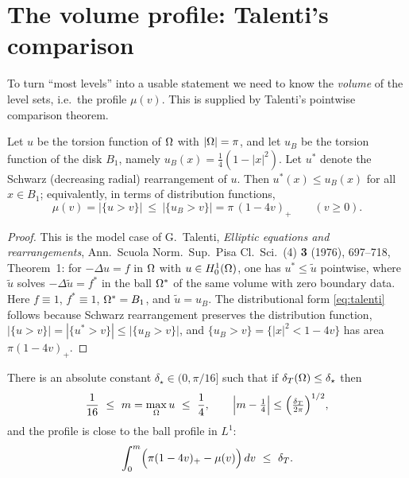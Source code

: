 \section{The volume profile: Talenti's comparison}\label{sec:talenti}

To turn ``most levels'' into a usable statement we need to know the
\emph{volume} of the level sets, i.e.\ the profile $\mu(v)$. This is
supplied by Talenti's pointwise comparison theorem.

\begin{theorem}[Talenti]\label{thm:talenti}
Let $u$ be the torsion function of $\Omega$ with $|\Omega|=\pi$, and let $u_B$ be
the torsion function of the disk $B_1$, namely
$u_B(x)=\tfrac14(1-|x|^2)$. Let $u^\ast$ denote the Schwarz (decreasing
radial) rearrangement of $u$. Then $u^\ast(x)\le u_B(x)$ for all $x\in
B_1$; equivalently, in terms of distribution functions,
\begin{equation}\label{eq:talenti}
   \mu(v)=|\{u>v\}|\ \le\ |\{u_B>v\}|=\pi\,(1-4v)_+\qquad(v\ge0).
\end{equation}
\end{theorem}

\begin{proof}
This is the model case of G.~Talenti, \emph{Elliptic equations and
rearrangements}, Ann.\ Scuola Norm.\ Sup.\ Pisa Cl.\ Sci.\ (4)
\textbf{3} (1976), 697--718, Theorem~1: for $-\Delta u=f$ in $\Omega$ with
$u\in H^1_0(\Omega)$, one has $u^\ast\le \tilde u$ pointwise, where $\tilde u$
solves $-\Delta\tilde u=f^\ast$ in the ball $\Omega^\ast$ of the same volume
with zero boundary data. Here $f\equiv1$, $f^\ast\equiv1$, $\Omega^\ast=B_1$,
and $\tilde u=u_B$. The distributional form \eqref{eq:talenti} follows
because Schwarz rearrangement preserves the distribution function,
$|\{u>v\}|=|\{u^\ast>v\}|\le|\{u_B>v\}|$, and
$\{u_B>v\}=\{|x|^2<1-4v\}$ has area $\pi(1-4v)_+$.
\end{proof}

\begin{corollary}\label{cor:profile}
There is an absolute constant $\delta_\star\in(0,\pi/16]$ such that if
$\delta_T(\Omega)\le\delta_\star$ then
\begin{equation}\label{eq:m-pin}
   \frac{1}{16}\ \le\ m=\max_\Omega u\ \le\ \frac14,
   \qquad
   \Bigl|m-\tfrac14\Bigr|\le\Bigl(\tfrac{\delta_T}{2\pi}\Bigr)^{1/2},
\end{equation}
and the profile is close to the ball profile in $L^1$:
\begin{equation}\label{eq:profile-L1}
   \int_0^m\Bigl(\pi(1-4v)_+-\mu(v)\Bigr)\,dv\ \le\ \delta_T .
\end{equation}
\end{corollary}

